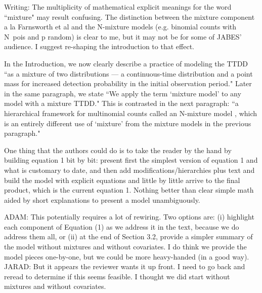 \documentclass[12pt]{article}
\renewenvironment{quote}  %
              {\list{}{\rightmargin\leftmargin}\normalfont%
               \item\relax}
              {\endlist}
\newcommand{\adam}[1]{{\color{blue} ADAM: #1}}
\newcommand{\jarad}[1]{{\color{Orange} JARAD: #1}}
\begin{document}
Writing: The multiplicity of mathematical explicit meanings for the word ``mixture" may result confusing. The distinction between the mixture component a la Farnsworth et al and the N-mixture models (e.g. binomial counts with N~pois and p random) is clear to me, but it may not be for some of JABES' audience.  I suggest re-shaping the introduction to that effect. 
\begin{quote}
In the Introduction, we now clearly describe a practice of modeling the TTDD ``as a mixture of two distributions --- a continuous-time distribution and a point mass for increased detection probability in the initial observation period."
Later in the same paragraph, we state ``We apply the term `mixture model' to any model with a mixture TTDD."
This is contrasted in the next paragraph: ``a hierarchical framework for multinomial counts called an N-mixture model \dotso, which is an entirely different use of `mixture' from the mixture models in the previous paragraph."
\end{quote}

One thing that the authors could do is to take the reader by the hand by building equation 1 bit by bit: present first the simplest version of equation 1 and what is customary to date, and then add modifications/hierarchies plus text and build the model with explicit equations and little by little arrive to the final product, which is the current equation 1. Nothing better than clear simple math aided by short explanations to present a model unambiguously.
\begin{quote}
\adam{
This potentially requires a lot of rewiring.  Two options are: (i) highlight each component of Equation (1) as we address it in the text, because we do address them all, or (ii) at the end of Section 3.2, provide a simpler summary of the model without mixtures and without covariates.
I do think we provide the model pieces one-by-one, but we could be more heavy-handed (in a good way).
}
\jarad{But it appears the reviewer wants it up front. 
I need to go back and reread to determine if this seems feasible. 
I thought we did start without mixtures and without covariates.}
\end{quote}
\end{document}
